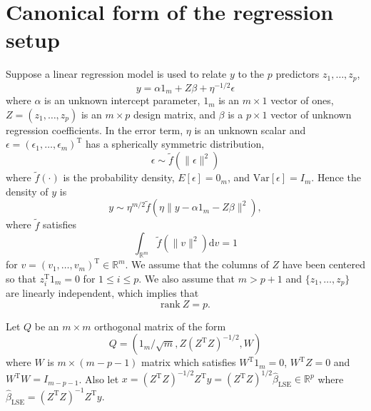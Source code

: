 \documentclass[preprint,11pt]{imsart}
\numberwithin{equation}{section}
\theoremstyle{plain}
\theoremstyle{definition}
\theoremstyle{remark}
\def\T{{ \mathrm{\scriptscriptstyle T} }}
\newcommand{\rd}{\mathrm{d}}
\begin{document}
\section{Canonical form of the regression setup}
\label{sec.regression}
 Suppose a linear regression model is used to relate $y$ to the
$p$ predictors $z_1, \dots, z_p$,
\begin{equation} \label{full-model}
y = \alpha 1_m+Z\beta + \eta^{-1/2}\epsilon
\end{equation}
where $\alpha$ is an unknown intercept parameter,
$1_m$ is an $m\times 1$ vector of ones,
$Z=(z_1,\dots, z_p)$ is an $m \times p$ design matrix,
and $\beta$ is a $p \times 1$ vector of unknown
regression coefficients.
In the error term, $\eta$ is an unknown scalar and
 $\epsilon=(\epsilon_1,\dots,\epsilon_m)^\T$ 
 has a spherically symmetric distribution,
\begin{equation}\label{bep_sim_f}
\epsilon \sim \tilde{f}(\|\epsilon\|^2)
\end{equation}
where $\tilde{f}(\cdot)$ is the probability density,
$E[\epsilon]=0_m$, 
and $\mbox{Var}[\epsilon]=I_m$.
Hence the density of $y$ is
\begin{equation}
 y\sim \eta^{m/2}\tilde{f}(\eta\|y-\alpha 1_m-Z\beta\|^2),
\end{equation}
where $\tilde{f}$ satisfies 
\begin{equation*}
 \int_{\mathbb{R}^m}\tilde{f}(\|v\|^2) \rd v=1 
\end{equation*}
for $v=(v_1,\dots,v_m)^\T\in\mathbb{R}^m$.
We assume that the columns of $Z$ have been centered so that 
$z_i^\T 1_m = 0$ for $1 \leq i \leq p$.
We also assume that $m > p+1$ and $\{z_1,\dots,z_p\}$ are linearly independent, 
which implies that 
\begin{equation*}
\mbox{rank} \ Z=p.
\end{equation*}

Let $Q$ be an $m\times m$ orthogonal matrix of the form
\begin{equation*}
 Q =(1_m/\sqrt{m}, Z(Z^\T Z)^{-1/2}, W)
\end{equation*}
where $W$ is $m\times (m-p-1)$ matrix which satisfies $ W^\T 1_m=0$, $ W^\T Z=0$
and $W^\T W=I_{m-p-1}$.
Also let $x=(Z^\T Z)^{-1/2}Z^\T y=(Z^\T Z)^{1/2}\hat{\beta}_{\mathrm{LSE}}\in\mathbb{R}^p$
where $\hat{\beta}_{\mathrm{LSE}}=(Z^\T Z)^{-1}Z^\T y$.
\end{document}
